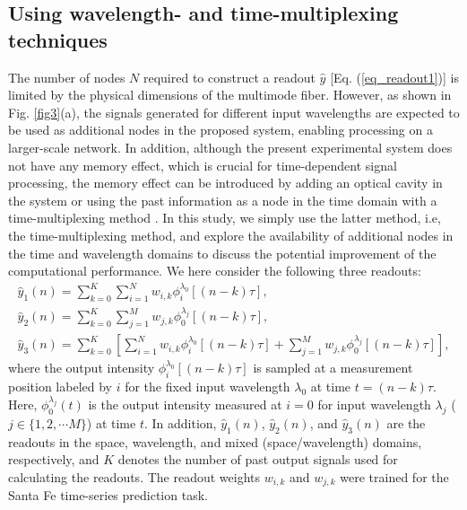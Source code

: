 \documentclass{article}
\begin{document}
\subsection{Using wavelength- and time-multiplexing techniques}
The number of nodes $N$ required to construct a readout $\hat{y}$ [Eq. (\ref{eq_readout1})] 
is limited by the physical dimensions of the multimode fiber. 
%
However, as shown in Fig. \ref{fig3}(a), 
the signals generated for different input wavelengths are expected to be used 
as additional nodes in the proposed system, 
enabling processing on a larger-scale network.
%
In addition, although the present experimental system does not have any memory
effect, which is crucial for time-dependent signal processing, the
memory effect can be introduced by adding an optical cavity in the
system \cite{Sunada2019} or using the past information as a node in the time
domain with a time-multiplexing method \cite{Appeltant2011}. 
%
In this study, we simply use the latter method, i.e, the time-multiplexing
method, and explore the availability of additional nodes in the time and
wavelength domains to discuss the potential improvement of the
computational performance. 
%
We here consider the following three readouts:
\begin{eqnarray}
\hat{y}_1(n)=\sum_{k=0}^K 
\sum_{i=1}^Nw_{i,k}\phi^{\lambda_0}_{i}[(n-k)\tau], \\
%
\hat{y}_2(n)=\sum_{k=0}^K
\sum_{j=1}^Mw_{j,k}\phi^{\lambda_j}_0[(n-k)\tau], \\
%
\hat{y}_3(n)=\sum_{k=0}^K
\left[
\sum_{i=1}^Nw_{i,k}\phi^{\lambda_0}_{i}[(n-k)\tau]+\sum_{j=1}^Mw_{j,k}\phi^{\lambda_j}_0[(n-k)\tau] 
\right], 
\end{eqnarray}
%
where
the output intensity $\phi_{i}^{\lambda_0}[(n-k)\tau]$ is 
sampled at a measurement position labeled by $i$ for the fixed input wavelength $\lambda_0$
at time $t = (n-k)\tau$.
%
Here, $\phi_{0}^{\lambda_j}(t)$ is the output intensity measured at $i =
0$ for input wavelength $\lambda_j$ ($j \in \{1,2,\cdots M\}$) at time $t$. 
%
In addition, $\hat{y}_1(n)$, $\hat{y}_2(n)$, and $\hat{y}_3(n)$ 
are the readouts in the space, wavelength, and mixed (space/wavelength)
domains, respectively, and 
%
$K$ denotes the number of past output signals used for
calculating the readouts. 
%
The readout weights $w_{i,k}$ and $w_{j,k}$ were trained for the Santa Fe time-series prediction task. 
\end{document}

